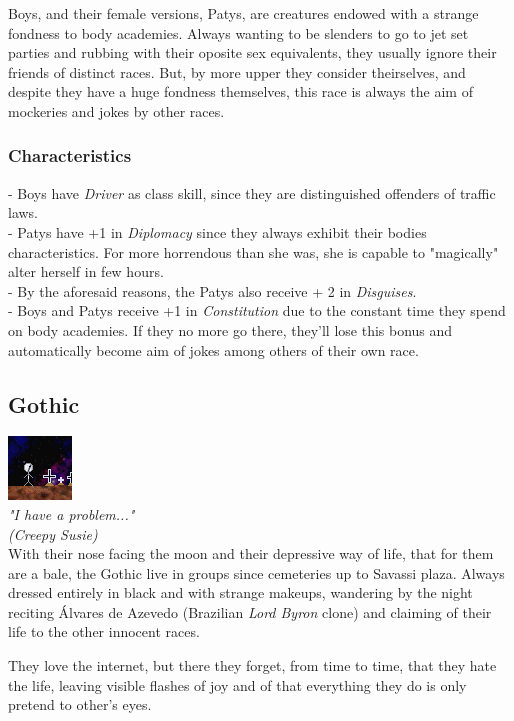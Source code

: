 \documentclass[ letterpaper,12pt]{article}
\begin{document}
Boys, and their female versions, Patys, are creatures endowed with a strange
fondness to body academies. Always wanting to be slenders to go to jet set
parties and rubbing with their oposite sex equivalents, they usually ignore
their friends of distinct races. But, by more upper they consider theirselves,
and despite they have a huge fondness themselves, this race is always the aim
of mockeries and jokes by other races.\\

\subsubsection{Characteristics}
- Boys have {\it Driver} as class skill, since they are distinguished offenders of traffic laws.\\
- Patys have +1 in {\it Diplomacy} since they always exhibit their bodies characteristics. For more horrendous than she was, she is capable to "magically" alter herself in few hours.\\
- By the aforesaid reasons, the Patys also receive + 2 in {\it Disguises}.\\
- Boys and Patys receive +1 in {\it Constitution} due to the constant time they spend on body academies. If they no more go there, they'll lose this bonus and automatically become aim of jokes among others of their own race.\\

\subsection{Gothic}
\includegraphics{../data/races/Img/gotico.png}\\
{\it "I have a problem..."
\\(Creepy Susie)}\\

With their nose facing the moon and their depressive way of life, that for them
are a bale, the Gothic live in groups since cemeteries up to Savassi plaza.
Always dressed entirely in black and with strange makeups, wandering by the
night reciting Álvares de Azevedo (Brazilian {\it Lord Byron} clone) and
claiming of their life to the other innocent races. 

They love the internet, but there they forget, from time to time, that they
hate the life, leaving visible flashes of joy and of that everything they do is
only pretend to other's eyes. 
\end{document}
